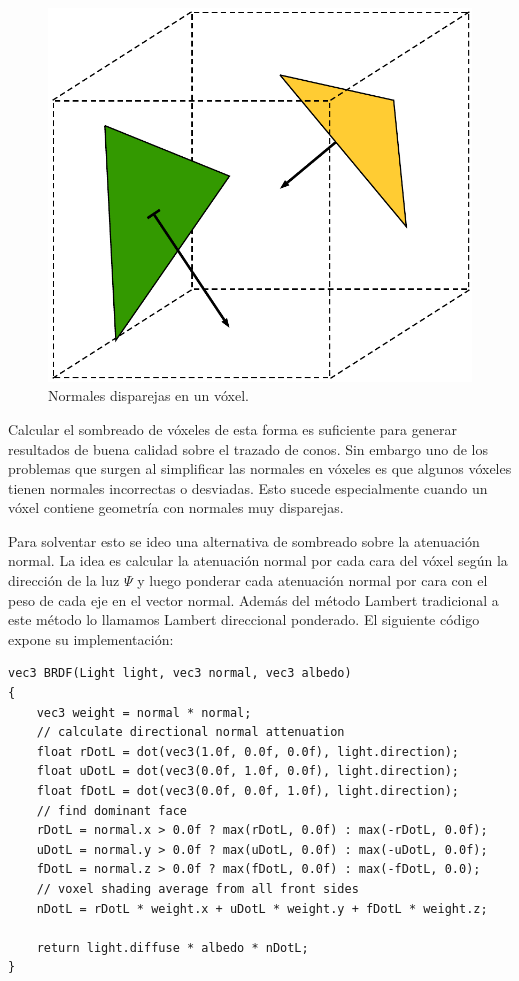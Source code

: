 \begin{figure}
	\centering
	\captionsetup{justification=centering}
	\includegraphics[width=\linewidth]{media/gimped_normals.pdf}
	\caption{Normales disparejas en un vóxel.}
	\label{fig:error_normals}
\end{figure}
Calcular el sombreado de vóxeles de esta forma es suficiente para generar resultados de buena calidad sobre el trazado de conos. Sin embargo uno de los problemas que surgen al simplificar las normales en vóxeles es que algunos vóxeles tienen normales incorrectas o desviadas. Esto sucede especialmente cuando un vóxel contiene geometría con normales muy disparejas. 

Para solventar esto se ideo una alternativa de sombreado sobre la atenuación normal. La idea es calcular la atenuación normal por cada cara del vóxel según la dirección de la luz $\Psi$ y luego ponderar cada atenuación normal por cara con el peso de cada eje en el vector normal. Además del método Lambert tradicional a este método lo llamamos Lambert direccional ponderado. El siguiente código expone su implementación:
\\
\begin{lstlisting}[caption={Sombreado direccional y ponderado según la normal para un vóxel}, label=Shading2]
vec3 BRDF(Light light, vec3 normal, vec3 albedo)
{
    vec3 weight = normal * normal;
    // calculate directional normal attenuation
    float rDotL = dot(vec3(1.0f, 0.0f, 0.0f), light.direction);
    float uDotL = dot(vec3(0.0f, 1.0f, 0.0f), light.direction);
    float fDotL = dot(vec3(0.0f, 0.0f, 1.0f), light.direction);
    // find dominant face
    rDotL = normal.x > 0.0f ? max(rDotL, 0.0f) : max(-rDotL, 0.0f);
    uDotL = normal.y > 0.0f ? max(uDotL, 0.0f) : max(-uDotL, 0.0f);
    fDotL = normal.z > 0.0f ? max(fDotL, 0.0f) : max(-fDotL, 0.0);
    // voxel shading average from all front sides
    nDotL = rDotL * weight.x + uDotL * weight.y + fDotL * weight.z;

    return light.diffuse * albedo * nDotL;
}
\end{lstlisting}

